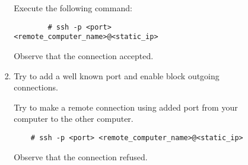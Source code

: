 \documentclass[a4paper,10pt]{article}
\begin{document}
\begin{enumerate}
\begin{enumerate}
\begin{enumerate}
\begin{enumerate}
                Execute the following command:
		\begin{verbatim}
		# ssh -p <port> <remote_computer_name>@<static_ip>
		\end{verbatim} 
                Observe that the connection accepted.

            \item Try to add a well known port and enable block outgoing connections.
            	
                  Try to make a remote connection using added port from your computer to the other computer.
\begin{verbatim}
    # ssh -p <port> <remote_computer_name>@<static_ip>
\end{verbatim}

                    Observe that the connection refused. 
            \end{enumerate}
        \end{enumerate}
    \end{enumerate}
\end{enumerate}
\end{document}

